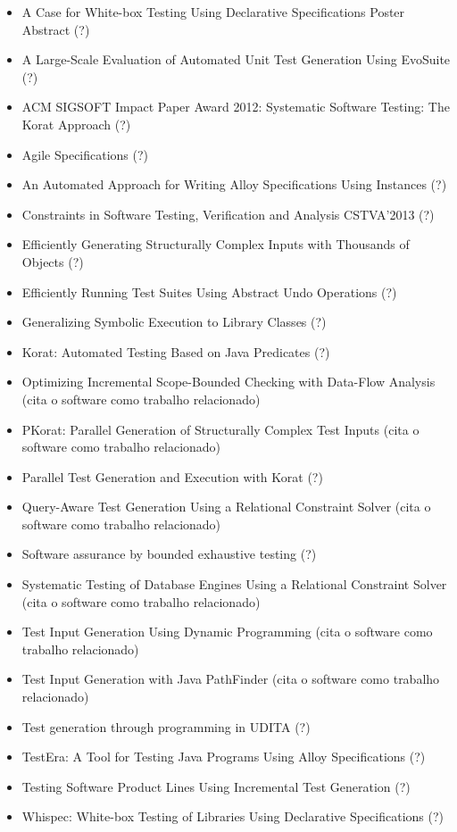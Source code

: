 \begin{itemize}
\item A Case for White-box Testing Using Declarative Specifications Poster Abstract (?)
\item A Large-Scale Evaluation of Automated Unit Test Generation Using EvoSuite (?)
\item ACM SIGSOFT Impact Paper Award 2012: Systematic Software Testing: The Korat Approach (?)
\item Agile Specifications (?)
\item An Automated Approach for Writing Alloy Specifications Using Instances (?)
\item Constraints in Software Testing, Verification and Analysis CSTVA'2013 (?)
\item Efficiently Generating Structurally Complex Inputs with Thousands of Objects (?)
\item Efficiently Running Test Suites Using Abstract Undo Operations (?)
\item Generalizing Symbolic Execution to Library Classes (?)
\item Korat: Automated Testing Based on Java Predicates (?)
\item Optimizing Incremental Scope-Bounded Checking with Data-Flow Analysis (cita o software como trabalho relacionado)
\item PKorat: Parallel Generation of Structurally Complex Test Inputs (cita o software como trabalho relacionado)
\item Parallel Test Generation and Execution with Korat (?)
\item Query-Aware Test Generation Using a Relational Constraint Solver (cita o software como trabalho relacionado)
\item Software assurance by bounded exhaustive testing (?)
\item Systematic Testing of Database Engines Using a Relational Constraint Solver (cita o software como trabalho relacionado)
\item Test Input Generation Using Dynamic Programming (cita o software como trabalho relacionado)
\item Test Input Generation with Java PathFinder (cita o software como trabalho relacionado)
\item Test generation through programming in UDITA (?)
\item TestEra: A Tool for Testing Java Programs Using Alloy Specifications (?)
\item Testing Software Product Lines Using Incremental Test Generation (?)
\item Whispec: White-box Testing of Libraries Using Declarative Specifications (?)
\end{itemize}

